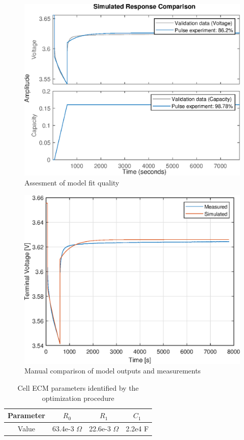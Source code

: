 \begin{figure}
    \centering
    \includegraphics{figures/6/pulse-compare.eps}
    \caption{Assesment of model fit quality}
    \label{fig:6-pulse-compare}
\end{figure}

\begin{figure}
    \centering
    \includegraphics{figures/6/pulse-verification.eps}
    \caption{Manual comparison of model outputs and measurements}
    \label{fig:6-pulse-verification}
\end{figure}

\begin{table}[]
    \centering
    \begin{tabular}{c|c|c|c}
         Parameter & $R_0$ & $R_1$ & $C_1$ \\ \hline
         Value &  63.4e-3 $\Omega$ & 22.6e-3 $\Omega$ & 2.2e4 F 
    \end{tabular}
    \caption{Cell ECM parameters identified by the optimization procedure}
    \label{tab:6-parameters}
\end{table}

